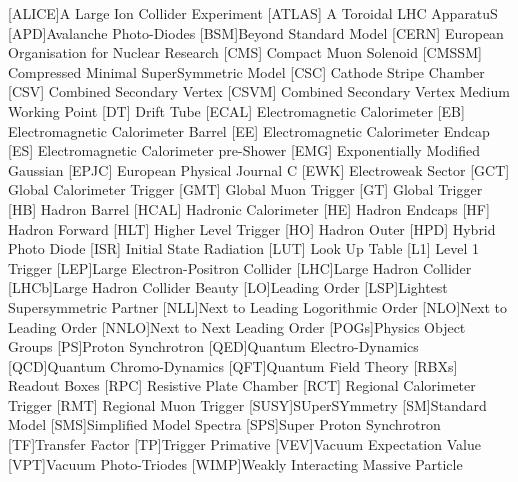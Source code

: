 \begin{acronym}[AAAAAAA]
[ALICE]{A Large Ion Collider Experiment}
 [ATLAS] {A Toroidal LHC ApparatuS}
[APD]{Avalanche Photo-Diodes}
[BSM]{Beyond Standard Model}
 [CERN] {European Organisation for Nuclear Research}
 [CMS] {Compact Muon Solenoid}
 [CMSSM] {Compressed Minimal SuperSymmetric Model}
 [CSC] {Cathode Stripe Chamber}
 [CSV] {Combined Secondary Vertex}
 [CSVM] {Combined Secondary Vertex Medium Working Point}
 [DT] {Drift Tube}
 [ECAL] {Electromagnetic Calorimeter}
 [EB] {Electromagnetic Calorimeter Barrel}
 [EE] {Electromagnetic Calorimeter Endcap}
 [ES] {Electromagnetic Calorimeter pre-Shower}
 [EMG] {Exponentially Modified Gaussian}
 [EPJC] {European Physical Journal C}
 [EWK] {Electroweak Sector}
 [GCT] {Global Calorimeter Trigger}
 [GMT] {Global Muon Trigger}
 [GT] {Global Trigger}
 [HB] {Hadron Barrel}
 [HCAL] {Hadronic Calorimeter}
 [HE] {Hadron Endcaps}
 [HF] {Hadron Forward}
[HLT] {Higher Level Trigger}
 [HO] {Hadron Outer}
 [HPD] {Hybrid Photo Diode}
 [ISR] {Initial State Radiation}
 [LUT] {Look Up Table}
 [L1] {Level 1 Trigger}
[LEP]{Large Electron-Positron Collider}
[LHC]{Large Hadron Collider}
[LHCb]{Large Hadron Collider Beauty}
[LO]{Leading Order}
[LSP]{Lightest Supersymmetric Partner}
[NLL]{Next to Leading Logorithmic Order}
[NLO]{Next to Leading Order}
[NNLO]{Next to Next Leading Order}
[POGs]{Physics Object Groups}
[PS]{Proton Synchrotron}
[QED]{Quantum Electro-Dynamics}
[QCD]{Quantum Chromo-Dynamics}
[QFT]{Quantum Field Theory}
 [RBXs] {Readout Boxes}
 [RPC] {Resistive Plate Chamber}
 [RCT] {Regional Calorimeter Trigger}
 [RMT] {Regional Muon Trigger}
[SUSY]{SUperSYmmetry}
[SM]{Standard Model}
[SMS]{Simplified Model Spectra}
[SPS]{Super Proton Synchrotron}
[TF]{Transfer Factor}
[TP]{Trigger Primative}
[VEV]{Vacuum Expectation Value}
[VPT]{Vacuum Photo-Triodes}
[WIMP]{Weakly Interacting Massive Particle}

\end{acronym}





